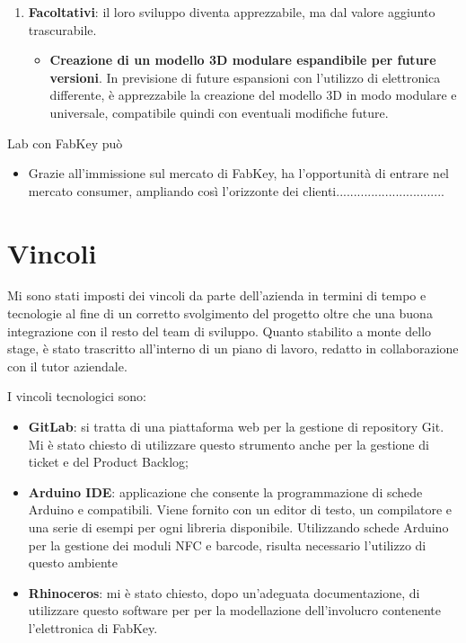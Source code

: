 \begin{enumerate}
\medskip

\item \textbf{Facoltativi}: il loro sviluppo diventa apprezzabile, ma dal valore aggiunto trascurabile.
\begin{itemize}
\item \textbf{Creazione di un modello 3D modulare espandibile per future versioni}. In previsione di future espansioni con l'utilizzo di elettronica differente, è apprezzabile la creazione del modello 3D in modo modulare e universale, compatibile quindi con eventuali modifiche future. 
\end{itemize}
\end{enumerate}

Lab con FabKey può

\begin{itemize}
\item Grazie all'immissione sul mercato di FabKey, \lab{} ha l'opportunità di entrare nel mercato consumer, ampliando così l'orizzonte dei clienti...............................
\end{itemize}

\section{Vincoli}
Mi sono stati imposti dei vincoli da parte dell'azienda in termini di tempo e tecnologie al fine di un corretto svolgimento del progetto oltre che una buona integrazione con il resto del team di sviluppo. Quanto stabilito a monte dello stage, è stato trascritto all'interno di un piano di lavoro, redatto in collaborazione con il tutor aziendale.

I vincoli tecnologici sono:
\begin{itemize}
\item \textbf{GitLab}: si tratta di una piattaforma web per la gestione di repository Git. Mi è stato chiesto di utilizzare questo strumento anche per la gestione di ticket e del Product Backlog;
\item \textbf{Arduino IDE}: applicazione che consente la programmazione di schede Arduino e compatibili. Viene fornito con un editor di testo, un compilatore e una serie di esempi per ogni libreria disponibile. Utilizzando schede Arduino per la gestione dei moduli NFC e barcode, risulta necessario l'utilizzo di questo ambiente 
\item \textbf{Rhinoceros}: mi è stato chiesto, dopo un'adeguata documentazione, di utilizzare questo software per per la modellazione dell'involucro contenente l'elettronica di FabKey.
\end{itemize}

